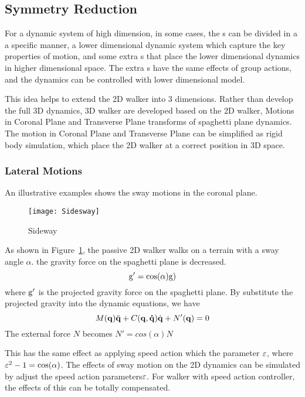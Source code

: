 {\subsection{Symmetry Reduction}
For a dynamic system of high dimension, in some cases, the {\dof}s can be divided in a a specific manner,
a lower dimensional dynamic system which capture the key properties of motion, 
and some extra {\dof}s that place the lower dimensional dynamics in higher dimensional space.
The extra {\dof}s have the same effects of group actions, and the dynamics can be controlled with lower dimensional model.



This idea helps to extend the 2D walker into 3 dimensions.
Rather than develop the full 3D dynamics, 3D walker are developed based on the 2D walker,
Motions in Coronal Plane and Transverse Plane transforms of spaghetti plane dynamics.
The motion in Coronal Plane and Transverse Plane can be simplified as rigid body simulation, which place the 2D walker at a correct position in 3D space.

\subsubsection*{Lateral Motions}
An illustrative examples shows the sway motions in the coronal plane.

\begin{figure}[!htbp]
  \begin{center}
      \texttt{[image: Sidesway]}
    \caption{Sideway}
    \label{fig:sidesway}
\end{center}
\end{figure}

As shown in Figure~\ref{fig:sidesway}, the passive 2D walker walks on a terrain with a sway angle $\alpha$.
the gravity force on the spaghetti plane is decreased.
\[
\mathrm{g}'=\cos(\alpha)\mathrm{g})
\]
where $\mathrm{g}'$ is the projected gravity force on the spaghetti plane.
By substitute the projected gravity into the dynamic equations, we have
\begin{equation}
\label{eq:flyequation}
M(\mathbf{q}) \ddot{\mathbf{q}} + C(\mathbf{q,\dot{q}})\dot{\mathbf{q}} + N'(\mathbf{q}) = 0
\end{equation}
The external force $N$ becomes $N'=cos(\alpha)N$

This has the same effect as applying speed action which the parameter $\varepsilon$, where $\varepsilon^2-1=\cos(\alpha)$.
The effects of sway motion on the 2D dynamics can be simulated by adjust the speed action parameters$\varepsilon$.
For walker with speed action controller, the effects of this {\dof} can be totally compensated.

}
